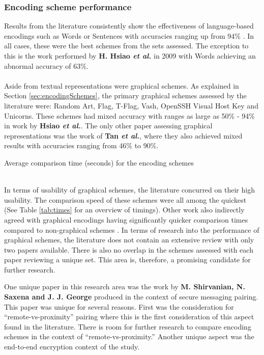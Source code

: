 \subsubsection*{Encoding scheme performance}
Results 
from the literature consistently show the effectiveness of language-based encodings such as Words or Sentences with accuracies ranging up from 94\% \cite{dechand2016empirical}\cite{tan2017can}\cite{kainda2009usability}. In all cases, these were the best schemes from the sets assessed. The exception to this is the work performed by \textbf{H. Hsiao \textit{et al.}}\cite{hsiao2009study} in 2009 with Words achieving an abnormal accuracy of 63\%.
\\\\
Aside from textual representations were graphical schemes. As explained in Section \ref{sec:encodingSchemes}, the primary graphical schemes assessed by the literature were: Random Art, Flag, T-Flag, Vash, OpenSSH Visual Host Key and Unicorns. These schemes had mixed accuracy with ranges as large as 50\% - 94\% in work by \textbf{Hsiao \textit{et al.}}\cite{hsiao2009study}. The only other paper assessing graphical representations was the work of \textbf{Tan \textit{et al.}}\cite{tan2017can}, where they also achieved mixed results with accuracies ranging from 46\% to 90\%.
\\
\begin{table}[h!]
    \makebox[\textwidth][c]{
        
    }%
    \caption{Average comparison time (seconds) for the encoding schemes}
    \label{tab:times}
\end{table}
\\
In terms of usability of graphical schemes, the literature concurred on their high usability. The comparison speed of these schemes were all among the quickest (See Table \ref{tab:times} for an overview of timings). Other work also indirectly agreed with graphical encodings having significantly quicker comparison times compared to non-graphical schemes \cite{dechand2016empirical, kainda2009usability}.
In terms of research into the performance of graphical schemes, the literature does not contain an extensive review with only two papers available. There is also no overlap in the schemes assessed with each paper reviewing a unique set. This area is, therefore, a promising candidate for further research.

One unique paper in this research area was the work by \textbf{M. Shirvanian, N. Saxena and J. J. George}\cite{shirvanian2017pitfalls} produced in the context of secure messaging pairing. This paper was unique for several reasons. First was the consideration for ``remote-vs-proximity'' pairing where this is the first consideration of this aspect found in the literature. There is room for further research to compare encoding schemes in the context of ``remote-vs-proximity.'' Another unique aspect was the end-to-end encryption context of the study.

